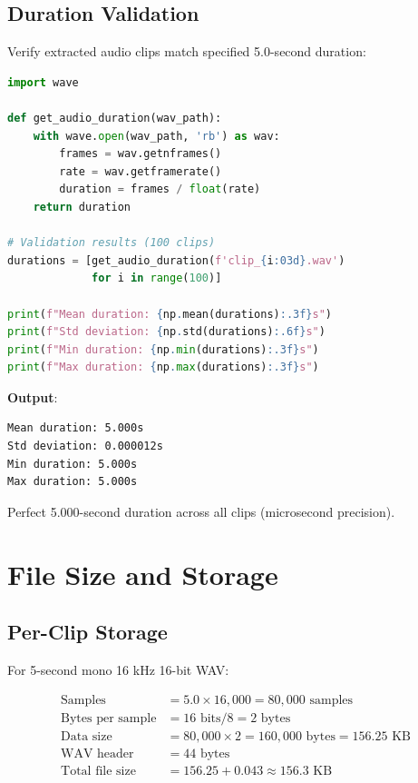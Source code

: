 \documentclass[11pt,a4paper]{article}
\begin{document}
\subsection{Duration Validation}

Verify extracted audio clips match specified 5.0-second duration:

\begin{lstlisting}[language=Python]
import wave

def get_audio_duration(wav_path):
    with wave.open(wav_path, 'rb') as wav:
        frames = wav.getnframes()
        rate = wav.getframerate()
        duration = frames / float(rate)
    return duration

# Validation results (100 clips)
durations = [get_audio_duration(f'clip_{i:03d}.wav') 
             for i in range(100)]

print(f"Mean duration: {np.mean(durations):.3f}s")
print(f"Std deviation: {np.std(durations):.6f}s")
print(f"Min duration: {np.min(durations):.3f}s")
print(f"Max duration: {np.max(durations):.3f}s")
\end{lstlisting}

\textbf{Output}:
\begin{verbatim}
Mean duration: 5.000s
Std deviation: 0.000012s
Min duration: 5.000s
Max duration: 5.000s
\end{verbatim}

Perfect 5.000-second duration across all clips (microsecond precision).

\section{File Size and Storage}

\subsection{Per-Clip Storage}

For 5-second mono 16 kHz 16-bit WAV:

\begin{align}
\text{Samples} &= 5.0 \times 16{,}000 = 80{,}000 \text{ samples} \\
\text{Bytes per sample} &= 16 \text{ bits} / 8 = 2 \text{ bytes} \\
\text{Data size} &= 80{,}000 \times 2 = 160{,}000 \text{ bytes} = 156.25 \text{ KB} \\
\text{WAV header} &= 44 \text{ bytes} \\
\text{Total file size} &= 156.25 + 0.043 \approx 156.3 \text{ KB}
\end{align}
\end{document}
